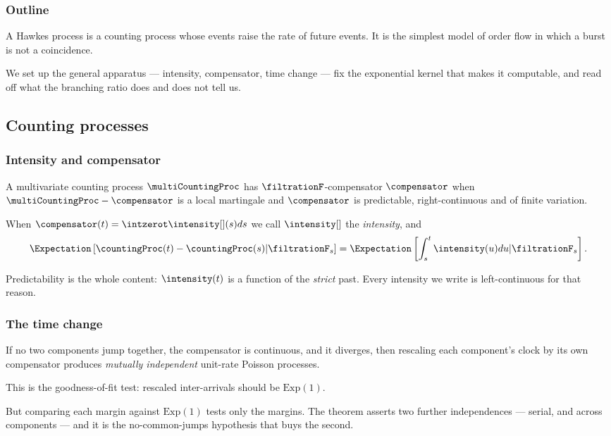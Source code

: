 \begin{frame}
  \frametitle{Outline}
\nocite{Haw71spe}
\nocite{HO74clu}
\nocite{DVJ08int}
\nocite{DZ13exa}
A Hawkes process is a counting process whose events raise the rate of future events.
It is the simplest model of order flow in which a burst is not a coincidence.

We set up the general apparatus --- intensity, compensator, time change ---
fix the exponential kernel that makes it computable,
and read off what the branching ratio does and does not tell us.
\end{frame}

\subsection{Counting processes}

\begin{frame}
  \frametitle{Intensity and compensator}
A multivariate counting process $\multiCountingProc$ has $\filtrationF$-compensator
$\compensator$ when $\multiCountingProc - \compensator$ is a local martingale
and $\compensator$ is predictable, right-continuous and of finite variation.

\pause

When $\compensator(t) = \intzerot \intensity[ ](s)ds$
we call $\intensity[ ]$ the \emph{intensity}, and
\begin{equation*}
 \Expectation\left[ \countingProc(t)-\countingProc(s) \vert \filtrationF_s \right]
 = \Expectation\left[ \int_{s}^{t} \intensity(u) du \vert \filtrationF_s \right] .
\end{equation*}

\pause

Predictability is the whole content: $\intensity(t)$ is a function of the \emph{strict} past.
Every intensity we write is left-continuous for that reason.
\end{frame}

\begin{frame}
  \frametitle{The time change}
\begin{thm}[Meyer, 1971]
 If no two components jump together, the compensator is continuous, and it diverges,
 then rescaling each component's clock by its own compensator produces
 \emph{mutually independent} unit-rate Poisson processes.
\end{thm}

\pause

This is the goodness-of-fit test: rescaled inter-arrivals should be $\text{Exp}(1)$.

\pause

But comparing each margin against $\text{Exp}(1)$ tests only the margins.
The theorem asserts two further independences --- serial, and across components ---
and it is the no-common-jumps hypothesis that buys the second.
\end{frame}

